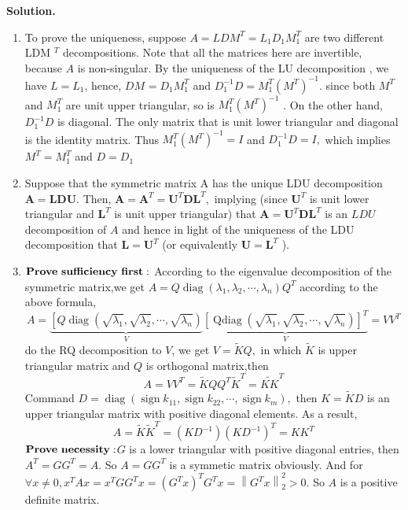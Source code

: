 \documentclass[english,onecolumn]{IEEEtran}
\begin{document}
\noindent\textbf{Solution.}
\begin{enumerate}
    \item 
To prove the uniqueness, suppose $A=L D M^{T}=L_{1} D_{1} M_{1}^{T}$ are two different LDM $^{T}$
decompositions. Note that all the matrices here are invertible, because $A$ is non-singular.
By the uniqueness of the LU decomposition , we have $L=L_{1}$, hence, $D M^{}=D_{1} M_{1}^{T}$ and $D_{1}^{-1} D=M_{1}^{T}\left(M^{T}\right)^{-1} .$ since both $M^{T}$ and $M_{1}^{T}$ are unit upper triangular, so is $M_{1}^{T}\left(M^{T}\right)^{-1}$ . On the other hand, $D_{1}^{-1} D$ is diagonal. The only matrix that is unit lower triangular and diagonal is the identity matrix. Thus $M_{1}^{T}\left(M^{T}\right)^{-1}=I$ and $D_{1}^{-1} D=I,$ which implies $M^{T}=M_{1}^{T}$ and $D=D_{1}$

    \item 
Suppose that the symmetric matrix A has the unique LDU decomposition $\mathbf{A}=\mathbf{L D U} .$ Then, $\mathbf{A}=\mathbf{A}^{T}=\mathbf{U}^{T} \mathbf{D} \mathbf{L}^{T},$ implying (since $\mathbf{U}^{T}$ is unit lower
triangular and $\mathbf{L}^{T}$ is unit upper triangular) that $\mathbf{A}=\mathbf{U}^{T} \mathbf{D} \mathbf{L}^{T}$ is an $LDU$ decomposition of $A$ and hence in light of the uniqueness of the LDU decomposition that $\mathbf{L}=\mathbf{U}^{T}$ (or equivalently $\mathbf{U}=\mathbf{L}^{T}$ ). $\quad$

    \item $\bold{Prove\  sufficiency\  first:}$
According to the eigenvalue decomposition of the symmetric matrix,we get
$
A=Q \operatorname{diag}\left(\lambda_{1}, \lambda_{2}, \cdots, \lambda_{n}\right) Q^{T}
$
according to the above formula,
$$
A=\underbrace{\left[Q \operatorname{diag}\left(\sqrt{\lambda_{1}}, \sqrt{\lambda_{2}}, \cdots, \sqrt{\lambda_{n}}\right)\right.}_{V} \underbrace{\left[\operatorname{Qdiag}\left(\sqrt{\lambda_{1}}, \sqrt{\lambda_{2}}, \cdots, \sqrt{\lambda_{n}}\right)\right]^{T}}_{V}=V V^{T}
$$
do the RQ decomposition to $V$, we get  $V=\widetilde{K} Q,$ in which $\widetilde{K}$ is upper triangular matrix and $Q$ is orthogonal matrix,then
$$
A=V V^{T}=\widetilde{K} Q Q^{T} \widetilde{K}^{T}=\widetilde{K K}^{T}
$$
Command $D=\operatorname{diag}\left(\operatorname{sign} k_{11}, \operatorname{sign} k_{22}, \cdots, \operatorname{sign} k_{m}\right),$ then $K=\tilde{K} D$ is an upper triangular matrix with positive diagonal elements. As a result,
$$
A=\widetilde{K} \widetilde{K}^{T}=\left(K D^{-1}\right)\left(K D^{-1}\right)^{T}=K K^{T}
$$
$\bold{Prove\  necessity:}$$G$ is a lower triangular with positive diagonal entries, then $A^{T}=G G^{T}=A .$ So $A=G G^{T}$ is a symmetic
matrix obviously. And for $\forall x \neq 0, x^{T} A x=x^{T} G G^{T} x=\left(G^{T} x\right)^{T} G^{T} x=\left\|G^{T} x\right\|_{2}^{2}>0 .$ So $A$ is a positive
definite matrix.



\end{enumerate}
\end{document}
